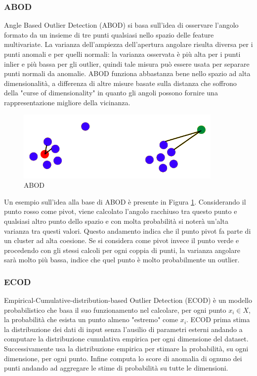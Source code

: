 \subsubsection{ABOD}
Angle Based Outlier Detection (ABOD) \cite{kriegel2008angle} si basa sull'idea di osservare l'angolo formato da un insieme di tre punti qualsiasi nello spazio delle feature multivariate. La varianza dell'ampiezza dell'apertura angolare risulta diversa per i punti anomali e per quelli normali: la varianza osservata è più alta per i punti inlier e più bassa per gli outlier, quindi tale misura può essere usata per separare punti normali da anomalie. ABOD funziona abbastanza bene nello spazio ad alta dimensionalità, a differenza di altre misure basate sulla distanza che soffrono della "curse of dimensionality" in quanto gli angoli possono fornire una rappresentazione migliore della vicinanza.
\begin{figure}[t]
	\centering
	\includegraphics[width=10cm, scale=1]{images/abod}
	\caption{ABOD}
	\label{abod}
\end{figure}
Un esempio sull'idea alla base di ABOD è presente in Figura \ref{abod}.
Considerando il punto rosso come pivot, viene calcolato l'angolo racchiuso tra questo punto e qualsiasi altro punto dello spazio e con molta probabilità si noterà un'alta varianza tra questi valori. Questo andamento indica che il punto pivot fa parte di un cluster ad alta coesione.
Se si considera come pivot invece il punto verde e procedendo con gli stessi calcoli per ogni coppia di punti, la varianza angolare sarà molto più bassa, indice che quel punto è molto probabilmente un outlier.

\subsubsection{ECOD}
Empirical-Cumulative-distribution-based Outlier Detection (ECOD) \cite{li2021ecod} è un modello probabilistico che basa il suo funzionamento nel calcolare, per ogni punto $x_i \in X$, la probabilità che esista un punto almeno "estremo" come $x_i$.
ECOD prima stima la distribuzione dei dati di input senza l'ausilio di parametri esterni andando a computare la distribuzione cumulativa empirica per ogni dimensione del dataset. Successivamente usa la distribuzione empirica per stimare la probabilità, su ogni dimensione, per ogni punto. Infine computa lo score di anomalia di ognuno dei punti andando ad aggregare le stime di probabilità su tutte le dimensioni.

